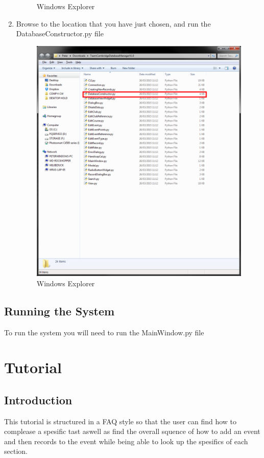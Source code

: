 \begin{enumerate}
\begin{figure}[H]
\caption{Windows Explorer} \label{fig:SyIsP4}
\end{figure}
\item Browse to the location that you have just chosen, and run the  DatabaseConstructor.py file
\begin{figure}[H]
\includegraphics[width=\textwidth]{./Manual/SystemInstall/Part5.png}
\caption{Windows Explorer} \label{fig:SyIsP5}
\end{figure}
\end{enumerate}
\subsection{Running the System}
To run the system you will need to run the MainWindow.py file
\section{Tutorial}

\subsection{Introduction}
This tutorial is structured in a FAQ style so that the user can find how to complease a spesific tast aswell as find the overall squence of how to add an event and then records to the event while being able to look up the spesifics of each section. 

